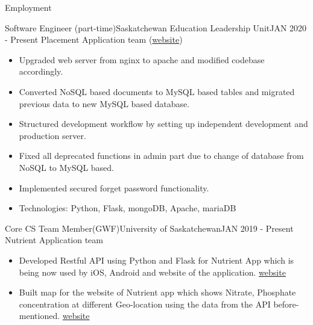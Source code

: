 \documentclass[]{mcdowellcv}
\begin{document}
	\begin{cvsection}{Employment}
	
	    \begin{cvsubsection}{Software Engineer (part-time)}{Saskatchewan Education Leadership Unit}{JAN 2020 - Present}
	    Placement Application team (\href{https://placement.usask.ca}{website})
    	    \begin{itemize}
    	        \item Upgraded web server from nginx to apache and modified codebase accordingly.
    	        \item Converted NoSQL based documents to MySQL based tables and migrated previous data to new MySQL based database.
    	        \item Structured development workflow by setting up independent development and production server.
    	        \item Fixed all deprecated functions in admin part due to change of database from NoSQL to MySQL based.
    	        \item Implemented secured forget password functionality.
    	        \item Technologies: Python, Flask, mongoDB, Apache, mariaDB
    	         
    	        
    	    \end{itemize}
    	
    	\end{cvsubsection}
    	
    		\begin{cvsubsection}{Core CS Team Member(GWF)}{University of Saskatchewan}{JAN 2019 - Present}
    		Nutrient Application team
    	    \begin{itemize}
    	        
    	        \item Developed Restful API using Python and Flask for Nutrient App  which is being now used by iOS, Android and website of the application. \href{https://gwf.usask.ca/projects-facilities/nutrient-app.php#Overview}{website}
    	        \item Built map for the website of Nutrient app which shows Nitrate, Phosphate concentration at different Geo-location using the data from the API before-mentioned. \href{https://gwf.usask.ca/projects-facilities/nutrient-app.php#ViewYourMeasurements}{website}
    	    \end{itemize}
    	
        \end{cvsubsection}
	

\end{cvsection}
\end{document}
